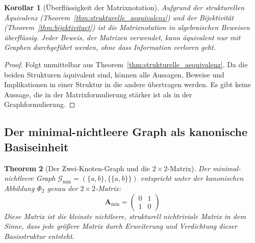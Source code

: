 \documentclass[12pt, a4paper]{article}
\newtheorem{theorem}{Theorem}[section]
\newtheorem{corollary}[theorem]{Korollar}
\theoremstyle{definition}
\theoremstyle{remark}
\newcommand{\vA}{\bm{A}}
\newcommand{\Graph}{\mathcal{G}}
\begin{document}
\begin{corollary}[Überflüssigkeit der Matrixnotation]
\label{cor:matrix_ueberfluessig}
Aufgrund der strukturellen Äquivalenz (Theorem~\ref{thm:strukturelle_aequivalenz}) und der Bijektivität (Theorem~\ref{thm:bijektivitaet}) ist die Matrixnotation in algebraischen Beweisen überflüssig. Jeder Beweis, der Matrizen verwendet, kann äquivalent nur mit Graphen durchgeführt werden, ohne dass Information verloren geht.
\end{corollary}

\begin{proof}
Folgt unmittelbar aus Theorem~\ref{thm:strukturelle_aequivalenz}. Da die beiden Strukturen äquivalent sind, können alle Aussagen, Beweise und Implikationen in einer Struktur in die andere übertragen werden. Es gibt keine Aussage, die in der Matrixformulierung stärker ist als in der Graphformulierung.
\end{proof}

\subsection{Der minimal-nichtleere Graph als kanonische Basiseinheit}
\label{subsec:minimal_basis}

\begin{theorem}[Der Zwei-Knoten-Graph und die $2 \times 2$-Matrix]
\label{thm:minimal_matrix}
Der minimal-nichtleere Graph $\Graph_{\min} = (\{a, b\}, \{\{a, b\}\})$ entspricht unter der kanonischen Abbildung $\Phi_2$ genau der $2 \times 2$-Matrix:
\[
  \vA_{\min} = \begin{pmatrix} 0 & 1 \\ 1 & 0 \end{pmatrix}
\]
Diese Matrix ist die \emph{kleinste} nichtleere, strukturell nichtriviale Matrix in dem Sinne, dass jede größere Matrix durch Erweiterung und Verdichtung dieser Basisstruktur entsteht.
\end{theorem}
\end{document}
